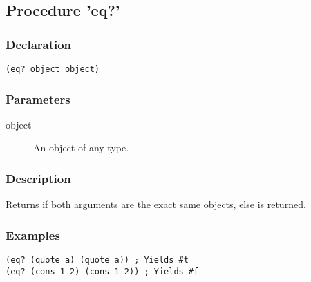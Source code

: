 \subsection{Procedure 'eq?'}
\label{builtins/eq}

\subsubsection*{Declaration}
\begin{lstlisting}
(eq? object object)
\end{lstlisting}

\subsubsection*{Parameters}
\begin{description}
	\item[object] An object of any type.
\end{description}

\subsubsection*{Description}
Returns \true{} if both arguments are the exact same objects, else \false{} is returned.

\subsubsection*{Examples}
\begin{lstlisting}
(eq? (quote a) (quote a)) ; Yields #t
(eq? (cons 1 2) (cons 1 2)) ; Yields #f
\end{lstlisting}
